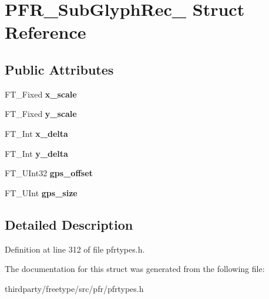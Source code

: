 \hypertarget{struct_p_f_r___sub_glyph_rec__}{}\section{P\+F\+R\+\_\+\+Sub\+Glyph\+Rec\+\_\+ Struct Reference}
\label{struct_p_f_r___sub_glyph_rec__}
\subsection*{Public Attributes}
\begin{DoxyCompactItemize}
\item 
\mbox{\label{struct_p_f_r___sub_glyph_rec___a0705bd25fd087e9ed789cb7aa023a461}} 
F\+T\+\_\+\+Fixed {\bfseries x\+\_\+scale}
\item 
\mbox{\label{struct_p_f_r___sub_glyph_rec___adc001eecbb94f40702eff3877d9f95a1}} 
F\+T\+\_\+\+Fixed {\bfseries y\+\_\+scale}
\item 
\mbox{\label{struct_p_f_r___sub_glyph_rec___a968d795ded4fc981d37f3f7da19db20b}} 
F\+T\+\_\+\+Int {\bfseries x\+\_\+delta}
\item 
\mbox{\label{struct_p_f_r___sub_glyph_rec___a246fbf19ed6e3b86870aad64ea186f80}} 
F\+T\+\_\+\+Int {\bfseries y\+\_\+delta}
\item 
\mbox{\label{struct_p_f_r___sub_glyph_rec___a4c593d934510582b6911dcd80965e3e2}} 
F\+T\+\_\+\+U\+Int32 {\bfseries gps\+\_\+offset}
\item 
\mbox{\label{struct_p_f_r___sub_glyph_rec___aa78217e910da51566e653b7ea0dca490}} 
F\+T\+\_\+\+U\+Int {\bfseries gps\+\_\+size}
\end{DoxyCompactItemize}


\subsection{Detailed Description}


Definition at line 312 of file pfrtypes.\+h.



The documentation for this struct was generated from the following file\+:\begin{DoxyCompactItemize}
\item 
thirdparty/freetype/src/pfr/pfrtypes.\+h\end{DoxyCompactItemize}
